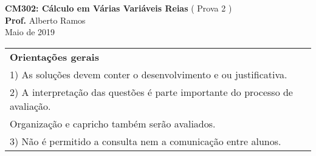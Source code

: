 \documentclass[11pt]{exam}
\begin{document}
\ifdefined\answers
\printanswers
\fi

\addpoints

\begin{center}
  {\bf \large CM302:  Cálculo em Várias Variáveis Reias} ( Prova 2 ) \\
  {\bf Prof.} Alberto Ramos \\
 Maio de 2019
\end{center}

\ifx\undefined\answers
\cellwidth{0pt}

\fi

\begin{center}
  \begin{tabular}{|l|}
    \hline
    {\bf Orientações gerais}\\
    1) As soluções devem conter o desenvolvimento e ou justificativa. 
    \hspace{2.5mm} \\
    2) A interpretação das questões é parte importante do processo de avaliação.\\
    \hspace{2.5mm} Organização e capricho também serão avaliados. \\
    3) Não é permitido a consulta nem a comunicação entre alunos.\\
   \hline 
  \end{tabular} 
\end{center}
  
  
\end{document}
